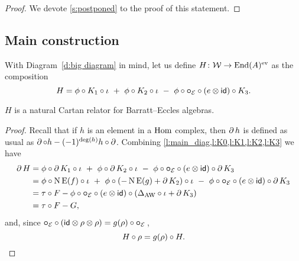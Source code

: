 \begin{proof}
	We devote \cref{s:postponed} to the proof of this statement.
\end{proof}

\subsection{Main construction}

With Diagram~\eqref{d:big diagram} in mind, let us define $H \colon \cW \to \End(A)^\ev$ as the composition
\[
H = \phi \comp K_1 \comp \iota \ +\ \phi \comp K_2 \comp \iota \ -\ \phi \comp \bcomp_{\BE} \comp (e \ot \id) \comp K_3.
\]

\begin{theorem}
	$H$ is a natural Cartan relator for Barratt--Eccles algebras.
\end{theorem}

\begin{proof}
	Recall that if $h$ is an element in a $\Hom$ complex, then $\bd h$ is defined as usual as $\bd \comp h - (-1)^{\deg(h)} h \comp \bd$.
	Combining \cref{l:main_diag,l:K0,l:K1,l:K2,l:K3} we have
	\begin{align*}
		\bd H &=
		\phi \comp \bd K_1 \comp \iota \ +\
		\phi \comp \bd K_2 \comp \iota \ -\
		\phi \comp \bcomp_{\BE} \comp (e \ot \id) \comp \bd K_3 \\ &=
		\phi \comp \chains\EE(f) \comp \iota \ +\
		\phi \comp (-\chains\EE(g) + \bd K_2) \comp \iota \ -\
		\phi \comp \bcomp_{\BE} \comp (e \ot \id) \comp \bd K_3 \\ &=
		\tau \comp F - \phi \comp \bcomp_{\BE} \comp (e \ot \id) \comp (\Delta_{\AW} \comp \iota + \bd K_3) \\ &=
		\tau \comp F - G,
	\end{align*}
	and, since $\bcomp_{\BE} \comp (\id \ot \rho \ot \rho) = g(\rho) \comp \bcomp_{\BE}$\,,
	\[
	H \comp \rho = g(\rho) \comp H. \qedhere
	\]
\end{proof}